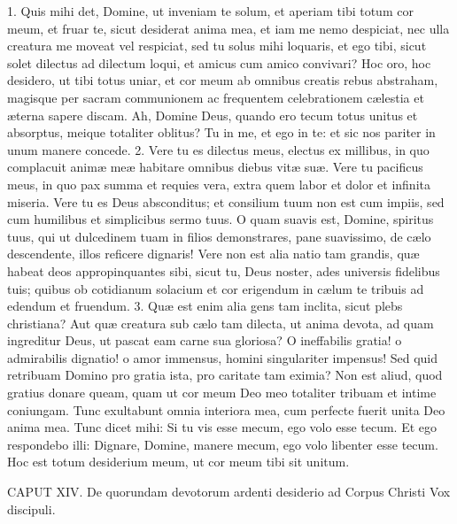 \documentclass[twoside]{article}
\begin{document}
1. Quis mihi det, Domine, ut inveniam te solum, et aperiam tibi totum cor meum, et fruar te, sicut desiderat anima mea, et iam me nemo despiciat, nec ulla creatura me moveat vel respiciat, sed tu solus mihi loquaris, et ego tibi, sicut solet dilectus ad dilectum loqui, et amicus cum amico convivari? Hoc oro, hoc desidero, ut tibi totus uniar, et cor meum ab omnibus creatis rebus abstraham, magisque per sacram communionem ac frequentem celebrationem cælestia et æterna sapere discam. Ah, Domine Deus, quando ero tecum totus unitus et absorptus, meique totaliter oblitus? Tu in me, et ego in te: et sic nos pariter in unum manere concede.
2. Vere tu es dilectus meus, electus ex millibus, in quo complacuit animæ meæ habitare omnibus diebus vitæ suæ. Vere tu pacificus meus, in quo pax summa et requies vera, extra quem labor et dolor et infinita miseria. Vere tu es Deus absconditus; et consilium tuum non est cum impiis, sed cum humilibus et simplicibus sermo tuus. O quam suavis est, Domine, spiritus tuus, qui ut dulcedinem tuam in filios demonstrares, pane suavissimo, de cælo descendente, illos reficere dignaris! Vere non est alia natio tam grandis, quæ habeat deos appropinquantes sibi, sicut tu, Deus noster, ades universis fidelibus tuis; quibus ob cotidianum solacium et cor erigendum in cælum te tribuis ad edendum et fruendum.
3. Quæ est enim alia gens tam inclita, sicut plebs christiana? Aut quæ creatura sub cælo tam dilecta, ut anima devota, ad quam ingreditur Deus, ut pascat eam carne sua gloriosa? O ineffabilis gratia! o admirabilis dignatio! o amor immensus, homini singulariter impensus! Sed quid retribuam Domino pro gratia ista, pro caritate tam eximia? Non est aliud, quod gratius donare queam, quam ut cor meum Deo meo totaliter tribuam et intime coniungam. Tunc exultabunt omnia interiora mea, cum perfecte fuerit unita Deo anima mea. Tunc dicet mihi: Si tu vis esse mecum, ego volo esse tecum. Et ego respondebo illi: Dignare, Domine, manere mecum, ego volo libenter esse tecum. Hoc est totum desiderium meum, ut cor meum tibi sit unitum.


CAPUT XIV.
De quorundam devotorum ardenti desiderio ad Corpus Christi
Vox discipuli.
\end{document}
